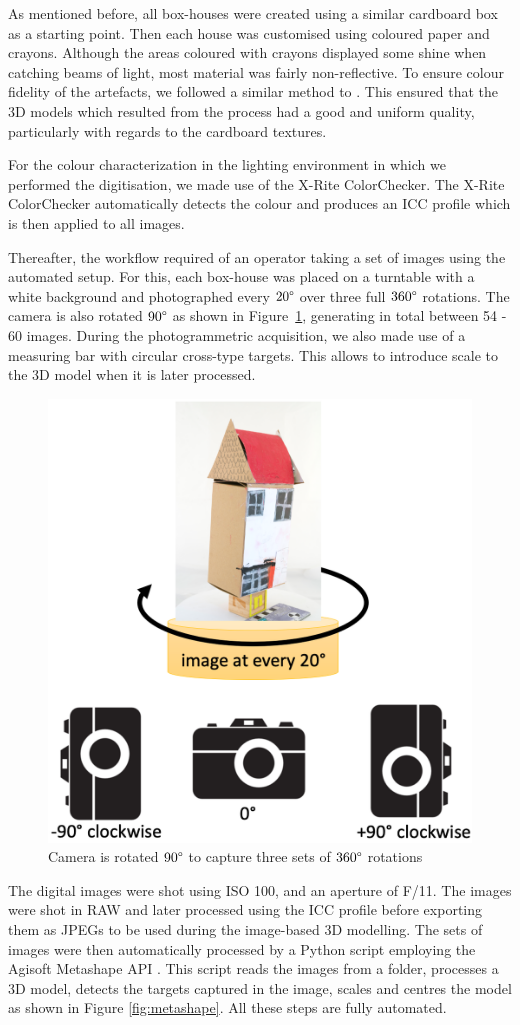 \documentclass[acmlarge,screen,dvipsnames]{acmart}
\begin{document}
As mentioned before, all box-houses were created using a similar cardboard box as a starting
point. Then each house was customised using coloured paper and crayons.
Although the areas coloured with crayons displayed some shine when catching
beams of light, most material was fairly non-reflective. To ensure colour fidelity of the
artefacts, we followed a similar method to \cite{Gaiani_2017}. This ensured that the 3D models which resulted from the process had a good and uniform quality, particularly with regards to the cardboard
textures.


For the colour characterization in the lighting environment in which we performed the
digitisation, we made use of the X-Rite ColorChecker. The X-Rite ColorChecker automatically detects the
colour and produces an ICC profile which is then applied to all
images.


Thereafter, the workflow required of an operator taking a set of images
using the automated setup. For this, each box-house was placed on a
turntable with a white background and photographed every $20\degree$
over three full $360\degree$ rotations. The camera is also 
rotated $90\degree$ as shown in Figure~\ref{fig:camrot}, generating in total between 54 - 60 images. 
During the photogrammetric acquisition, we also made use of a measuring bar with circular cross-type targets. This
allows to introduce scale to the 3D model when it is later processed.

\begin{figure}[h]
\includegraphics[width=0.6\linewidth]{images/camerarot.png}
\caption{Camera is rotated $90\degree$ to capture three sets of $360\degree$ rotations} \label{fig:camrot} 
\end{figure}

The digital images were shot using ISO 100, and an aperture of F/11. The
images were shot in RAW and later processed using the ICC profile before
exporting them as JPEGs to be used during the image-based 3D modelling. The sets of images were then automatically processed by a Python
script employing the Agisoft Metashape API \cite{Metashapesite}. This
script reads the images from a folder, processes a 3D model, detects the
targets captured in the image, scales and centres the model as shown in
Figure \ref{fig:metashape}. All these steps are fully automated.
\end{document}
